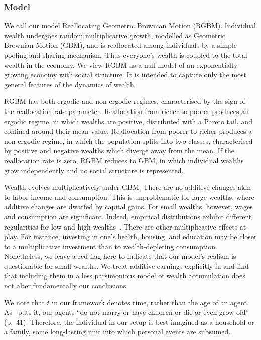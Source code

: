 \subsubsection{Model}\label{sec:model}

We call our model Reallocating Geometric Brownian Motion (RGBM). Individual wealth undergoes random multiplicative growth, modelled as Geometric Brownian Motion (GBM), and is reallocated among individuals by a simple pooling and sharing mechanism. Thus everyone's wealth is coupled to the total wealth in the economy. We view RGBM as a null model
of an exponentially growing economy with social structure. It is intended to capture only the most general features of the dynamics of wealth.

RGBM has both ergodic and non-ergodic regimes, characterised by the sign of the reallocation rate parameter. Reallocation from richer to poorer produces an ergodic regime, in which wealths are positive, distributed with a Pareto tail, and confined around their mean value. Reallocation from poorer to richer produces a non-ergodic regime, in which the population splits into two classes, characterised by positive and negative wealths which diverge away from the mean. If the reallocation rate is zero, RGBM reduces to GBM, in which individual wealths grow independently and no social structure is represented.

Wealth evolves multiplicatively under GBM. There are no additive changes akin to labor income and consumption. This is unproblematic for large wealths, where additive changes are dwarfed by capital gains. For small wealths, however, wages and consumption are significant. Indeed, empirical distributions exhibit different regularities for low and high wealths~\cite{DragulescuYakovenko2001}. There are other multiplicative effects at play. For instance, investing in one's health, housing, and education may be closer to a multiplicative investment than to wealth-depleting consumption. Nonetheless, we leave a red flag here to indicate that our model's realism is questionable for small wealths. We treat additive earnings explicitly in  and find that including them in a less parsimonious model of wealth accumulation does not alter fundamentally our conclusions.

We note that $t$ in our framework denotes time, rather than the age of an agent. As~\cite{meade1964efficiency} puts it, our agents ``do not marry or have children or die or even grow old'' (p.~41). Therefore, the individual in our setup is best imagined as a household or a family, \ie some long-lasting unit into which personal events are subsumed.

